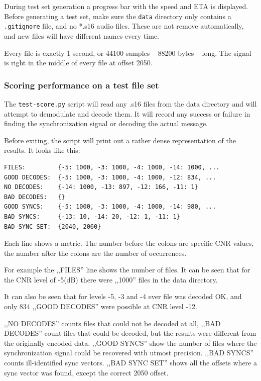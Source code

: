 \documentclass[a4paper]{article}
\begin{document}
During test set generation a progress bar with the speed and ETA is 
displayed. Before generating a test set, make sure the \texttt{data} 
directory only contains a \texttt{.gitignore} file, and no *.s16 audio 
files. These are not remove automatically, and new files will have 
different names every time.

Every file is exactly 1 second, or 44100 samples -- 88200 bytes -- 
long. The signal is right in the middle of every file at offset 2050.

\subsubsection{Scoring performance on a test file set}

The \texttt{test-score.py} script will read any .s16 files from the 
data directory and will attempt to demodulate and decode them. It will 
record any success or failure in finding the synchronization signal or 
decoding the actual message.

Before exiting, the script will print out a rather dense representation 
of the results. It looks like this:

\begin{lstlisting}
FILES:         {-5: 1000, -3: 1000, -4: 1000, -14: 1000, ...
GOOD DECODES:  {-5: 1000, -3: 1000, -4: 1000, -12: 834, ...
NO DECODES:    {-14: 1000, -13: 897, -12: 166, -11: 1}
BAD DECODES:   {}
GOOD SYNCS:    {-5: 1000, -3: 1000, -4: 1000, -14: 980, ...
BAD SYNCS:     {-13: 10, -14: 20, -12: 1, -11: 1}
BAD SYNC SET:  {2040, 2060}
\end{lstlisting}

Each line shows a metric. The number before the colons are specific CNR 
values, the number after the colons are the number of occurrences.

For example the ,,FILES'' line shows the number of files. It can be 
seen that for the CNR level of -5(dB) there were ,,1000'' files in the 
data directory.

It can also be seen that for levels -5, -3 and -4 ever file was decoded 
OK, and only 834 ,,GOOD DECODES'' were possible at CNR level -12.

,,NO DECODES'' counts files that could not be decoded at all, ,,BAD 
DECODES'' count files that could be decoded, but the results were 
different from the originally encoded data. ,,GOOD SYNCS'' show the 
number of files where the synchronization signal could be recovered 
with utmost precision. ,,BAD SYNCS'' counts ill-identified sync 
vectors. ,,BAD SYNC SET'' shows all the offsets where a sync vector was 
found, except the correct 2050 offset.
\end{document}
